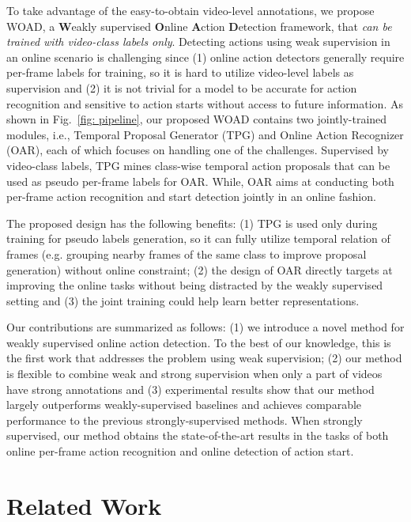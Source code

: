\documentclass[final]{cvpr}
\begin{document}
To take advantage of the easy-to-obtain video-level annotations, we propose WOAD, a \textbf{W}eakly supervised \textbf{O}nline \textbf{A}ction \textbf{D}etection framework, that \emph{can be trained with video-class labels only}. Detecting actions using weak supervision in an online scenario is challenging since (1) online action detectors generally require per-frame labels for training, so it is hard to utilize video-level labels as supervision and (2) it is not trivial for a model to be accurate for action recognition and sensitive to action starts without access to future information. As shown in Fig.~\ref{fig: pipeline}, our proposed WOAD contains two jointly-trained modules, i.e., Temporal Proposal Generator (TPG) and Online Action Recognizer (OAR), each of which focuses on handling one of the challenges. Supervised by video-class labels, TPG mines class-wise temporal action proposals that can be used as pseudo per-frame labels for OAR. While, OAR aims at conducting both per-frame action recognition and start detection jointly in an online fashion. 

The proposed design has the following benefits: (1) TPG is used only during training for pseudo labels generation, so it can fully utilize temporal relation of frames (e.g. grouping nearby frames of the same class to improve proposal generation) without online constraint; (2) the design of OAR directly targets at improving the online tasks without being distracted by the weakly supervised setting and (3) the joint training could help learn better representations.

Our contributions are summarized as follows: (1) we introduce a novel method for weakly supervised online action detection. To the best of our knowledge, this is the first work that addresses the problem using weak supervision; (2) our method is flexible to combine weak and strong supervision when only a part of videos have strong annotations and (3) experimental results show that our method largely outperforms weakly-supervised baselines and achieves comparable performance to the previous strongly-supervised methods. When strongly supervised, our method obtains the state-of-the-art results in the tasks of both online per-frame action recognition and online detection of action start.
\section{Related Work}
\end{document}
